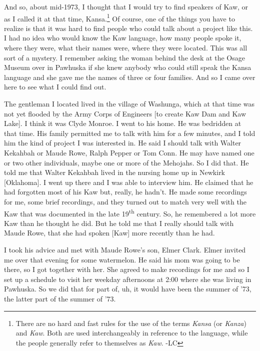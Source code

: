 \documentclass[output=paper]{LSP/langsci}
\begin{document}
And so, about mid-1973, I thought that I would try to find speakers of Kaw, or as I called it at that time, Kansa.\footnote{There are no hard and fast rules for the use of the terms \textit{Kansa} (or \textit{Kanza}) and \textit{Kaw}. Both are used interchangeably in reference to the language, while the people generally refer to themselves as \textit{Kaw}. -LC} Of course, one of the things you have to realize is that it was hard to find people who could talk about a project like this. I had no idea who would know the Kaw language, how many people spoke it, where they were, what their names were, where they were located. This was all sort of a mystery. I remember asking the woman behind the desk at the Osage Museum over in Pawhuska if she knew anybody who could still speak the Kansa language and she gave me the names of three or four families. And so I came over here to see what I could find out. 

The gentleman I located lived in the village of Washunga, which at that time was not yet flooded by the Army Corps of Engineers [to create Kaw Dam and Kaw Lake]. I think it was Clyde Monroe. I went to his home. He was bedridden at that time. His family permitted me to talk with him for a few minutes, and I told him the kind of project I was interested in. He said I should talk with Walter Kekahbah or Maude Rowe, Ralph Pepper or Tom Conn. He may have named one or two other individuals, maybe one or more of the Mehojahs. So I did that. He told me that Walter Kekahbah lived in the nursing home up in Newkirk [Oklahoma]. I went up there and I was able to interview him. He claimed that he had forgotten most of his Kaw but, really, he hadn't. He made some recordings for me, some brief recordings, and they turned out to match very well with the Kaw that was documented in the late 19\textsuperscript{th} century. So, he remembered a lot more Kaw than he thought he did. But he told me that I really should talk with Maude Rowe, that she had spoken [Kaw] more recently than he had. 

I took his advice and met with Maude Rowe's son, Elmer Clark. Elmer invited me over that evening for some watermelon. He said his mom was going to be there, so I got together with her. She agreed to make recordings for me and so I set up a schedule to visit her weekday afternoons at 2:00 where she was living in Pawhuska. So we did that for part of, uh, it would have been the summer of '73, the latter part of the summer of '73. 
\end{document}
